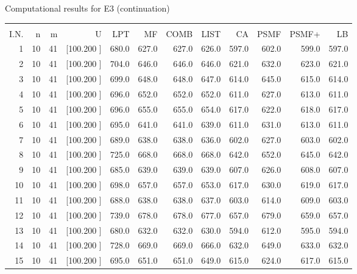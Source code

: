 \documentclass[12pt,a4paper]{article}
\begin{document}
\newpage
\begin{center}
 Computational results for E3 (continuation) {\tiny
\begin{tabular}{r r r r r r r r r r r r}\hline
    &   &   &          &        &        &        &        &        &        &        &       \\[-0.1in]
  I.N.  &  n  &  m  &  U  &  LPT  &  MF  &  COMB  &  LIST  &  CA  & PSMF &PSMF+ & LB \\[0.03in]
\hline
   1& 10& 41&[100.200   ]&   680.0&   627.0&   627.0&   626.0&   597.0&   602.0&   599.0&   597.0\\[-0.02in]
   2& 10& 41&[100.200   ]&   704.0&   646.0&   646.0&   646.0&   621.0&   632.0&   623.0&   621.0\\[-0.02in]
   3& 10& 41&[100.200   ]&   699.0&   648.0&   648.0&   647.0&   614.0&   645.0&   615.0&   614.0\\[-0.02in]
   4& 10& 41&[100.200   ]&   696.0&   652.0&   652.0&   652.0&   611.0&   627.0&   613.0&   611.0\\[-0.02in]
   5& 10& 41&[100.200   ]&   696.0&   655.0&   655.0&   654.0&   617.0&   622.0&   618.0&   617.0\\[-0.02in]
   6& 10& 41&[100.200   ]&   695.0&   641.0&   641.0&   639.0&   611.0&   631.0&   613.0&   611.0\\[-0.02in]
   7& 10& 41&[100.200   ]&   689.0&   638.0&   638.0&   636.0&   602.0&   627.0&   603.0&   602.0\\[-0.02in]
   8& 10& 41&[100.200   ]&   725.0&   668.0&   668.0&   668.0&   642.0&   652.0&   645.0&   642.0\\[-0.02in]
   9& 10& 41&[100.200   ]&   685.0&   639.0&   639.0&   639.0&   607.0&   626.0&   608.0&   607.0\\[-0.02in]
  10& 10& 41&[100.200   ]&   698.0&   657.0&   657.0&   653.0&   617.0&   630.0&   619.0&   617.0\\[-0.02in]
  11& 10& 41&[100.200   ]&   688.0&   638.0&   638.0&   637.0&   603.0&   614.0&   609.0&   603.0\\[-0.02in]
  12& 10& 41&[100.200   ]&   739.0&   678.0&   678.0&   677.0&   657.0&   679.0&   659.0&   657.0\\[-0.02in]
  13& 10& 41&[100.200   ]&   680.0&   632.0&   632.0&   630.0&   594.0&   612.0&   595.0&   594.0\\[-0.02in]
  14& 10& 41&[100.200   ]&   728.0&   669.0&   669.0&   666.0&   632.0&   649.0&   633.0&   632.0\\[-0.02in]
  15& 10& 41&[100.200   ]&   695.0&   651.0&   651.0&   649.0&   615.0&   624.0&   617.0&   615.0\\[-0.02in]

\end{tabular}}
\end{center}
\end{document}
